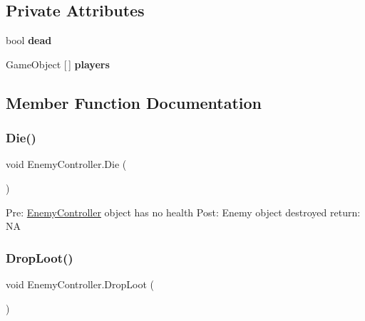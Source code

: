 \subsection*{Private Attributes}
\begin{DoxyCompactItemize}
\item 
\mbox{\label{class_enemy_controller_a2428b11f3cec6e784f7982b60fcc0147}} 
bool {\bfseries dead}
\item 
\mbox{\label{class_enemy_controller_a6377a2b1989ecfdde0904d0ef5d9af0a}} 
Game\+Object \mbox{[}$\,$\mbox{]} {\bfseries players}
\end{DoxyCompactItemize}


\subsection{Member Function Documentation}
\mbox{\label{class_enemy_controller_aa2585b33cdd57288a0c5a669f188f6ca}} 
\subsubsection{\texorpdfstring{Die()}{Die()}}
{\footnotesize\ttfamily void Enemy\+Controller.\+Die (\begin{DoxyParamCaption}{ }\end{DoxyParamCaption})\hspace{0.3cm}{\ttfamily [private]}}

Pre\+: \hyperlink{class_enemy_controller}{Enemy\+Controller} object has no health Post\+: Enemy object destroyed return\+: NA \mbox{\label{class_enemy_controller_a98b4f2b8c651189ef6b419e6400abc36}} 
\subsubsection{\texorpdfstring{Drop\+Loot()}{DropLoot()}}
{\footnotesize\ttfamily void Enemy\+Controller.\+Drop\+Loot (\begin{DoxyParamCaption}{ }\end{DoxyParamCaption})\hspace{0.3cm}{\ttfamily [private]}}

